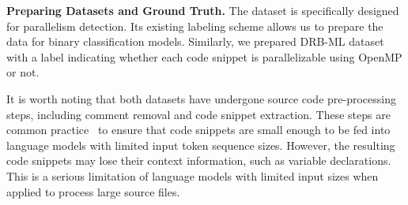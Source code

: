 
\textbf{Preparing Datasets and Ground Truth.}
The \crawldata dataset is specifically designed for parallelism detection. 
Its existing labeling scheme allows us to prepare the data for binary classification models. 
Similarly, we prepared DRB-ML dataset with a label indicating whether each code snippet is parallelizable using OpenMP or not.  

It is worth noting that both datasets have undergone source code pre-processing steps, including comment removal and code snippet extraction. These steps are common practice~\cite{chen2023learning-dataset} to ensure that code snippets are small enough to be fed into language models with limited input token sequence sizes. However, the resulting code snippets may lose their context information, such as variable declarations. This is a serious limitation of language models with limited input sizes when applied to process large source files. 

  

